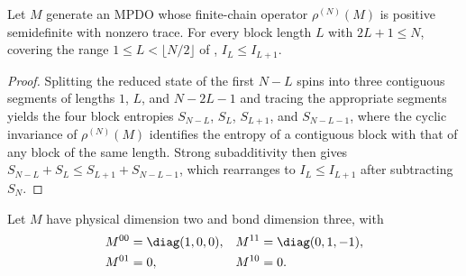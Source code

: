 \begin{lemma}
    \label{prop:mutual_info_monotone}
    \leanok
    Let $M$ generate an MPDO whose finite-chain operator $\rho^{(N)}(M)$ is
    positive semidefinite with nonzero trace. For every block length $L$ with
    $2L+1\le N$, covering the range $1\le L<\lfloor N/2\rfloor$ of
    \cite[Proposition~4.5, line~801]{Cirac2016MPDO_arXiv}, $I_L\le I_{L+1}$.
\end{lemma}
\begin{proof}\leanok
    Splitting the reduced state of the first $N-L$ spins into three contiguous
    segments of lengths $1$, $L$, and $N-2L-1$ and tracing the appropriate
    segments yields the four block entropies
    $S_{N-L}$, $S_L$, $S_{L+1}$, and $S_{N-L-1}$, where the cyclic invariance of
    $\rho^{(N)}(M)$ identifies the entropy of a contiguous block with that of any
    block of the same length. Strong subadditivity then gives
    $S_{N-L}+S_L\le S_{L+1}+S_{N-L-1}$, which rearranges to
    $I_L\le I_{L+1}$ after subtracting $S_N$.
\end{proof}

\begin{definition}
    \label{def:parity_mpdo_counterexample}
    \leanok
    Let $M$ have physical dimension two and bond dimension three, with
    \begin{align}
        M^{00} & =\diag(1,0,0),         &
        M^{11} & =\diag(0,1,-1), \notag   \\
        M^{01} & =0,                    &
        M^{10} & =0.
        \notag
    \end{align}
\end{definition}

